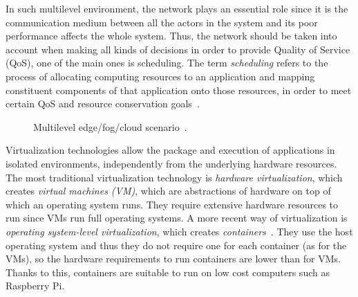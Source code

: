 \documentclass[conference]{IEEEtran}
\begin{document}
In such multilevel environment, the network plays an essential role since it is the communication medium between all the actors in the system and its poor performance affects the whole system. Thus, the network should be taken into account when making all kinds of decisions in order to provide Quality of Service (QoS), one of the main ones is scheduling. The term \emph{scheduling} refers to the process of allocating computing resources to an application and mapping constituent components of that application onto those resources, in order to meet certain QoS and resource conservation goals~\cite{Pinedo08}. %

\begin{figure}[t!]
\begin{center}
\strut{}
\caption{Multilevel edge/fog/cloud scenario~\cite{BittencourtMBRP17}.}\label{fig:edgefogcloud}
\end{center}
\end{figure}


Virtualization technologies allow the package and execution of applications in isolated environments, independently from the underlying hardware resources. The most traditional virtualization technology is \emph{hardware virtualization}, which creates \emph{virtual machines (VM)}, which are abstractions of hardware on top of which an operating system runs. They require extensive hardware resources to run since VMs run full operating systems. A more recent way of virtualization is \emph{operating system-level virtualization}, which creates \emph{containers}~\cite{Buyya13}. They  use the host operating system and thus they do not require one for each container (as for the VMs), so the hardware requirements to run containers are lower than for VMs. Thanks to this, containers are suitable to run on low cost computers such as Raspberry Pi.  
\end{document}
